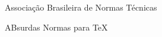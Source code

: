 %
%
%
%
%


\item[ABNT] Associação Brasileira de Normas Técnicas
\item[abnTeX] ABsurdas Normas para TeX